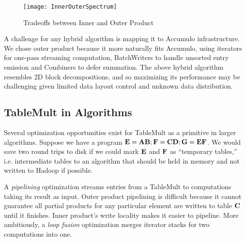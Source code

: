 \begin{figure}[htb]
\centering
\texttt{[image: InnerOuterSpectrum]}
\vspace{-12pt}
\caption{Tradeoffs between Inner and Outer Product}
\label{fInnerOuterSpectrum}
\vspace{-6pt}
\end{figure}


A challenge for any hybrid algorithm is mapping it to Accumulo infrastructure.
We chose outer product because it more naturally fits Accumulo, 
using iterators for one-pass streaming computation, 
BatchWriters to handle unsorted entry emission and Combiners to defer summation.
The above hybrid algorithm resembles 2D block decompositions,
and so maximizing its performance may be challenging 
given limited data layout control and unknown data distribution.


\subsection{TableMult in Algorithms}
Several optimization opportunities exist for TableMult as a primitive in larger algorithms.
Suppose we have a program $\mathbf{E} = \mathbf{AB}; \mathbf{F} = \mathbf{CD}; \mathbf{G} = \mathbf{EF}$.
We would save two round trips to disk if we could mark $\mathbf{E}$ and $\mathbf{F}$ as 
``temporary tables,'' i.e. intermediate tables to an algorithm that should be held in memory 
and not written to Hadoop if possible.

A \emph{pipelining} optimization streams entries from a TableMult 
to computations taking its result as input. 
Outer product pipelining is difficult
because it cannot guarantee all partial products for any particular element 
are written to table $\mathbf{C}$ until it finishes.
Inner product's write locality makes it easier to pipeline.
More ambitiously, a \emph{loop fusion} optimization merges iterator stacks 
for two computations into one. 

